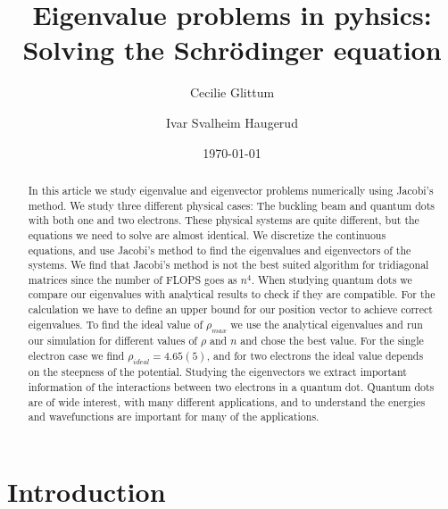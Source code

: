 \documentclass[%
 reprint,
nofootinbib,
aps,
]{revtex4-1}
\begin{document}

\title{Eigenvalue problems in pyhsics:\\
Solving the Schrödinger equation}%

\author{Cecilie Glittum}
\author{Ivar Svalheim Haugerud}

%


\date{\today}%

\begin{abstract}
In this article we study eigenvalue and eigenvector problems numerically using Jacobi's method. We study three different physical cases: The buckling beam and quantum dots with both one and two electrons. These physical systems are quite different, but the equations we need to solve are almost identical. We discretize the continuous equations, and use Jacobi's method to find the eigenvalues and eigenvectors of the systems. We find that Jacobi's method is not the best suited algorithm for tridiagonal matrices since the number of FLOPS goes as $n^4$. When studying quantum dots we compare our eigenvalues with analytical results to check if they are compatible. For the calculation we have to define an upper bound for our position vector to achieve correct eigenvalues. To find the ideal value of $\rho_{max}$ we use the analytical eigenvalues and run our simulation for different values of $\rho$ and $n$ and chose the best value. For the single electron case we find $\rho_{ideal}=4.65(5)$, and for two electrons the ideal value depends on the steepness of the potential. Studying the eigenvectors we extract important information of the interactions between two electrons in a quantum dot. Quantum dots are of wide interest, with many different applications, and to understand the energies and wavefunctions are important for many of the applications.
\end{abstract}


\maketitle


\section{Introduction}
\end{document}
